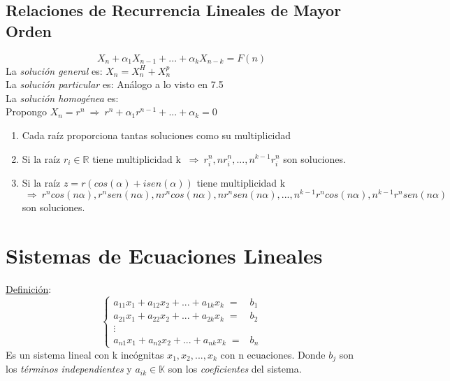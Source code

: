 \documentclass{article}
\newcommand{\cuerpo}{\mathbb{K}}                        %
\newcommand{\reales}{\mathbb{R}}                        %
\newcommand{\Rightarrows}{\: \Rightarrow \:}            %
\begin{document}
\subsection{Relaciones de Recurrencia Lineales de Mayor Orden}
\begin{equation*}
    X_n + \alpha_1 X_{n-1} + ... + \alpha_k X_{n-k} = F(n)
\end{equation*}
La \emph{solución general} es: $X_n = X_n ^H + X_n ^p$
\\La \emph{solución particular} es: Análogo a lo visto en 7.5
\\La \emph{solución homogénea} es: 
\\  Propongo $X_n = r^n \Rightarrows r^n + \alpha_1 r^{n-1} + ... + \alpha_k =0$
\begin{enumerate}
    \item Cada raíz proporciona tantas soluciones como su multiplicidad
    \item Si la raíz $r_i \in \reales$ tiene multiplicidad k $\Rightarrows r_i ^n, nr_i ^n, ... , n^{k-1}r_i^n$ son soluciones.
    \item Si la raíz $z=r(cos(\alpha)+isen(\alpha))$ tiene multiplicidad k
    \\ $\Rightarrows r^ncos(n\alpha),r^nsen(n\alpha),nr^ncos(n\alpha),nr^nsen(n\alpha),...,n^{k-1}r^ncos(n\alpha),n^{k-1}r^nsen(n\alpha)$ son soluciones.
\end{enumerate}
\pagebreak

\section{Sistemas de Ecuaciones Lineales}
\underline{Definición}:
\begin{equation*}
    \begin{cases}
        a_{11}x_1 + a_{12}x_2 + ... + a_{1k}x_k \;=& b_1 \\
        a_{21}x_1 + a_{22}x_2 + ... + a_{2k}x_k \;=& b_2 \\
        \vdots &  \\
        a_{n1}x_1 + a_{n2}x_2 + ... + a_{nk}x_k \;=& b_n
    \end{cases}
\end{equation*}
Es un sistema lineal con k incógnitas $x_1, x_2, ..., x_k$ con n ecuaciones. Donde $b_j$ son los \emph{términos independientes} y $a_{ik} \in \cuerpo$ son los \emph{coeficientes} del sistema.
\end{document}
